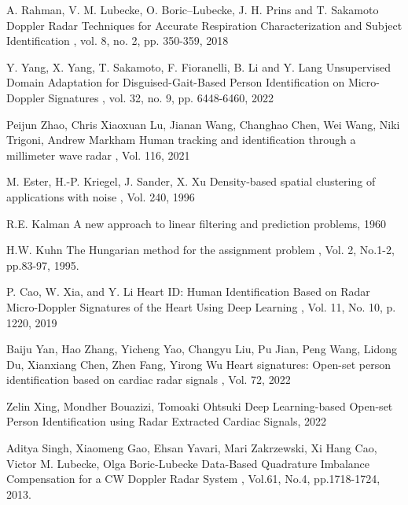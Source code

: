 \begin{bib}[100]
  A. Rahman, V. M. Lubecke, O. Boric–Lubecke, J. H. Prins and T. Sakamoto
  \newblock Doppler Radar Techniques for Accurate Respiration Characterization and Subject Identification
  , vol. 8, no. 2, pp. 350-359, 2018


  Y. Yang, X. Yang, T. Sakamoto, F. Fioranelli, B. Li and Y. Lang
  \newblock Unsupervised Domain Adaptation for Disguised-Gait-Based Person Identification on Micro-Doppler Signatures
  , vol. 32, no. 9, pp. 6448-6460, 2022

  Peijun Zhao, Chris Xiaoxuan Lu, Jianan Wang, Changhao Chen, Wei Wang, Niki Trigoni, Andrew Markham
  \newblock Human tracking and identification through a millimeter wave radar
  , Vol. 116, 2021

  M. Ester, H.-P. Kriegel, J. Sander, X. Xu
  \newblock Density-based spatial clustering of applications with noise
  , Vol. 240, 1996

  R.E. Kalman
  \newblock A new approach to linear filtering and prediction problems, 1960

  H.W. Kuhn
  \newblock The Hungarian method for the assignment problem
  , Vol. 2, No.1-2, pp.83-97, 1995.

  P. Cao, W. Xia, and Y. Li
  \newblock Heart ID: Human Identification Based on Radar Micro-Doppler Signatures of the Heart Using Deep Learning
  , Vol. 11, No. 10, p. 1220, 2019

Baiju Yan, Hao Zhang, Yicheng Yao, Changyu Liu, Pu Jian, Peng Wang, Lidong Du, Xianxiang Chen, Zhen Fang, Yirong Wu
\newblock Heart signatures: Open-set person identification based on cardiac radar signals
, Vol. 72, 2022

  Zelin Xing, Mondher Bouazizi, Tomoaki Ohtsuki
  \newblock Deep Learning-based Open-set Person Identification using Radar Extracted Cardiac Signals, 2022
	
  Aditya Singh, Xiaomeng Gao, Ehsan Yavari, Mari Zakrzewski, Xi Hang Cao, Victor M. Lubecke, Olga Boric-Lubecke
  \newblock Data-Based Quadrature Imbalance Compensation for a CW Doppler Radar System
  , Vol.61, No.4, pp.1718-1724, 2013.


\end{bib}
